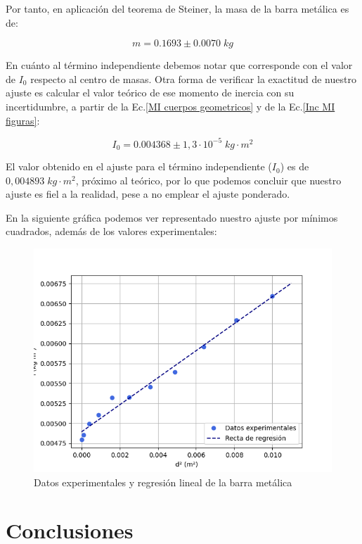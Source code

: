 \documentclass[a4paper,12pt,titlepage]{report}
\begin{document}
Por tanto, en aplicación del teorema de Steiner, la masa de la barra metálica es de:

\begin{equation}
    m = 0.1693 \pm 0.0070 \; kg
\end{equation}

En cuánto al término independiente debemos notar que corresponde con el valor de $I_0$ respecto al centro de masas. Otra forma de verificar la exactitud de nuestro ajuste es calcular el valor teórico de ese momento de inercia con su incertidumbre, a partir de la Ec.\ref{MI cuerpos geometricos} y de la Ec.\ref{Inc MI figuras}:

\begin{equation}
    I_0 = 0.004368 \pm 1,3 \cdot 10^{-5} \; kg \cdot m^2
\end{equation}

El valor obtenido en el ajuste para el término independiente ($I_0$) es de $0,004893 \; kg\cdot m^2$, próximo al teórico, por lo que podemos concluir que nuestro ajuste es fiel a la realidad, pese a no emplear el ajuste ponderado.

En la siguiente gráfica podemos ver representado nuestro ajuste por mínimos cuadrados, además de los valores experimentales:

\begin{figure}[h!]
    \centering
    \includegraphics[width=0.75\linewidth]{Images/regSteiner2.png}
    \caption{Datos experimentales y regresión lineal de la barra metálica}
\end{figure}

\newpage

\section{Conclusiones}
\end{document}
